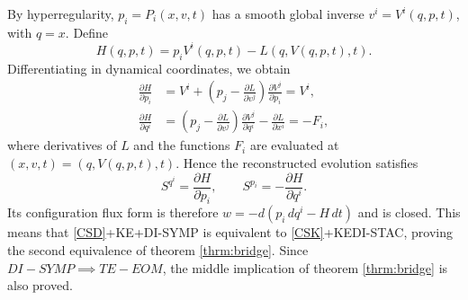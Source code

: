 \documentclass[nofootinbib,aps,pre]{revtex4-2}
\begin{document}
By hyperregularity, $p_i=P_i(x,v,t)$ has a smooth global inverse
$v^i=V^i(q,p,t)$, with $q=x$. Define
\begin{equation}
	H(q,p,t)
	=
	p_iV^i(q,p,t)-L(q,V(q,p,t),t).
\end{equation}
Differentiating in dynamical coordinates, we obtain
\begin{equation}
	\begin{aligned}
		\frac{\partial H}{\partial p_i}
		&=
		V^i+
		\left(p_j-\frac{\partial L}{\partial v^j}\right)
		\frac{\partial V^j}{\partial p_i}
		=
		V^i,\\
		\frac{\partial H}{\partial q^i}
		&=
		\left(p_j-\frac{\partial L}{\partial v^j}\right)
		\frac{\partial V^j}{\partial q^i}
		-
		\frac{\partial L}{\partial x^i}
		=
		-F_i,
	\end{aligned}
\end{equation}
where derivatives of $L$ and the functions $F_i$ are evaluated at
$(x,v,t)=(q,V(q,p,t),t)$. Hence the reconstructed evolution satisfies
\begin{equation}
	S^{q^i}=\frac{\partial H}{\partial p_i},
	\qquad
	S^{p_i}=-\frac{\partial H}{\partial q^i}.
\end{equation}
Its configuration flux form is therefore
$w=-d(p_i\,dq^i-H\,dt)$ and is closed. This means that \ref{CSD}+KE+DI-SYMP is equivalent to \ref{CSK}+KEDI-STAC, proving the second equivalence of theorem \ref{thrm:bridge}. Since $DI-SYMP \implies TE-EOM$, the middle implication of theorem \ref{thrm:bridge} is also proved.
\end{document}
